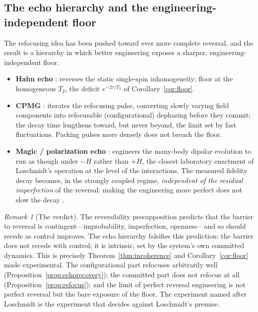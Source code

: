 \documentclass[11pt,a4paper]{article}
\theoremstyle{thmstyle}
\theoremstyle{definition}
\theoremstyle{remark}
\newtheorem{remark}[theorem]{Remark}
\begin{document}
\subsection{The echo hierarchy and the engineering-independent floor}
\label{sec:hierarchy}

The refocusing idea has been pushed toward ever more complete reversal,
and the result is a hierarchy in which better engineering exposes a
sharper, engineering-independent floor.

\begin{itemize}[leftmargin=1.4em]
\item \textbf{Hahn echo} \citep{hahn1950}: reverses the static
single-spin inhomogeneity; floor at the homogeneous $T_2$, the deficit
$e^{-2\tau/T_2}$ of Corollary~\ref{cor:floor}.
\item \textbf{CPMG} \citep{carr1954,meiboom1958}: iterates the refocusing
pulse, converting slowly varying field components into refocusable
(configurational) dephasing before they commit; the decay time lengthens
toward, but never beyond, the limit set by fast fluctuations. Packing pulses
more densely does not breach the floor.
\item \textbf{Magic / polarization echo} \citep{rhim1971,levstein1998}:
engineers the many-body dipolar evolution to run as though under $-H$
rather than $+H$, the closest laboratory enactment of Loschmidt's
operation at the level of the interactions. The measured fidelity decay
becomes, in the strongly coupled regime, \emph{independent of the residual
imperfection} of the reversal: making the engineering more perfect does not
slow the decay \citep{levstein1998,jalabert2001,peres1984,gorin2006}.
\end{itemize}

\begin{remark}[The verdict]
\label{rem:verdict}
The reversibility presupposition predicts that the barrier to reversal is
contingent---improbability, imperfection, openness---and so should recede as
control improves. The echo hierarchy falsifies this prediction: the barrier
does not recede with control; it is intrinsic, set by the system's own
committed dynamics. This is precisely Theorem~\ref{thm:incoherence} and
Corollary~\ref{cor:floor} made experimental. The configurational part
refocuses arbitrarily well (Proposition~\ref{prop:echorecovery}); the
committed part does not refocus at all (Proposition~\ref{prop:refocus}); and
the limit of perfect reversal engineering is not perfect reversal but the
bare exposure of the floor. The experiment named after Loschmidt is the
experiment that decides against Loschmidt's premise.
\end{remark}
\end{document}
